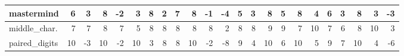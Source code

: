 \begin{table}[!h]
{\begin{tabular}{|p{2.9cm}|rr|rr|rr|rr|rr|r||rr|rr|rr|rr|rr|r|}
			mastermind             & \cellcolor[HTML]{A6CB96}6            & {\cellcolor[HTML]{D3E5CB}3}            & \cellcolor[HTML]{88BA73}8            & {\cellcolor[HTML]{FAE4E3}-2}           & \cellcolor[HTML]{D3E5CB}3            & {\cellcolor[HTML]{88BA73}8}            & \cellcolor[HTML]{E2EEDC}2            & {\cellcolor[HTML]{97C384}7}            & \cellcolor[HTML]{88BA73}8            & {\cellcolor[HTML]{FCF1F1}-1}           & \cellcolor[HTML]{FFD699}-4            & \cellcolor[HTML]{B5D4A7}5            & {\cellcolor[HTML]{D3E5CB}3}            & \cellcolor[HTML]{88BA73}8            & {\cellcolor[HTML]{B5D4A7}5}            & \cellcolor[HTML]{88BA73}8            & {\cellcolor[HTML]{C4DDB9}4}            & \cellcolor[HTML]{A6CB96}6            & {\cellcolor[HTML]{D3E5CB}3}            & \cellcolor[HTML]{88BA73}8            & {\cellcolor[HTML]{D3E5CB}3}            & \cellcolor[HTML]{BE9255}-3            \\ \hline
			middle\_char.          & \cellcolor[HTML]{97C384}7            & {\cellcolor[HTML]{97C384}7}            & \cellcolor[HTML]{88BA73}8            & {\cellcolor[HTML]{97C384}7}            & \cellcolor[HTML]{B5D4A7}5            & {\cellcolor[HTML]{88BA73}8}            & \cellcolor[HTML]{88BA73}8            & {\cellcolor[HTML]{88BA73}8}            & \cellcolor[HTML]{88BA73}8            & {\cellcolor[HTML]{88BA73}8}            & \cellcolor[HTML]{DAE7FD}2             & \cellcolor[HTML]{88BA73}8            & {\cellcolor[HTML]{88BA73}8}            & \cellcolor[HTML]{79B161}9            & {\cellcolor[HTML]{79B161}9}            & \cellcolor[HTML]{97C384}7            & {\cellcolor[HTML]{6AA84F}10}           & \cellcolor[HTML]{97C384}7            & {\cellcolor[HTML]{A6CB96}6}            & \cellcolor[HTML]{88BA73}8            & {\cellcolor[HTML]{6AA84F}10}           & \cellcolor[HTML]{858C9E}3             \\ \hline
			paired\_digits         & \cellcolor[HTML]{6AA84F}10           & {\cellcolor[HTML]{F7D7D5}-3}           & \cellcolor[HTML]{6AA84F}10           & {\cellcolor[HTML]{FAE4E3}-2}           & \cellcolor[HTML]{6AA84F}10           & {\cellcolor[HTML]{D3E5CB}3}            & \cellcolor[HTML]{88BA73}8            & {\cellcolor[HTML]{88BA73}8}            & \cellcolor[HTML]{6AA84F}10           & {\cellcolor[HTML]{FAE4E3}-2}           & \cellcolor[HTML]{FFAD33}-8            & \cellcolor[HTML]{79B161}9            & {\cellcolor[HTML]{C4DDB9}4}            & \cellcolor[HTML]{6AA84F}10           & {\cellcolor[HTML]{A6CB96}6}            & \cellcolor[HTML]{6AA84F}10           & {\cellcolor[HTML]{B5D4A7}5}            & \cellcolor[HTML]{79B161}9            & {\cellcolor[HTML]{97C384}7}            & \cellcolor[HTML]{6AA84F}10           & {\cellcolor[HTML]{C4DDB9}4}            & \cellcolor[HTML]{DA9530}-6            \\ \hline

\end{tabular}}
\end{table}
